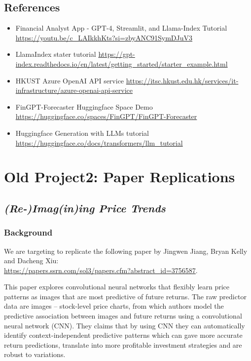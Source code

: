 \documentclass[11pt]{article}
\begin{document}
\subsection{References}
\begin{itemize}
    \item Financial Analyst App - GPT-4, Streamlit, and Llama-Index Tutorial \url{https://youtu.be/c_LAIkkhKts?si=zbyANC91SymDJuV3}
    \item LlamaIndex stater tutorial \url{https://gpt-index.readthedocs.io/en/latest/getting_started/starter_example.html}
    \item HKUST Azure OpenAI API service \url{https://itsc.hkust.edu.hk/services/it-infrastructure/azure-openai-api-service}
    \item FinGPT-Forecaster Huggingface Space Demo \url{https://huggingface.co/spaces/FinGPT/FinGPT-Forecaster}
    \item Huggingface Generation with LLMs tutorial \url{https://huggingface.co/docs/transformers/llm_tutorial}
\end{itemize}



\section{Old Project2: Paper Replications}

\subsection{\emph{(Re-)Imag(in)ing Price Trends}}

\subsubsection{Background}
We are targeting to replicate the following paper by Jingwen Jiang, Bryan Kelly and Dacheng Xiu: \\
\url{https://papers.ssrn.com/sol3/papers.cfm?abstract_id=3756587}.

This paper explores convolutional neural networks that flexibly learn price patterns as images that are most predictive of future returns. The raw predictor data are images -- stock-level price charts, from which authors model the predictive association between images and future returns using a convolutional neural network (CNN). They claims that by using CNN they can automatically identify context-independent predictive patterns which can gave more accurate return predictions, translate into more profitable investment strategies and are robust to variations. 
\end{document}
